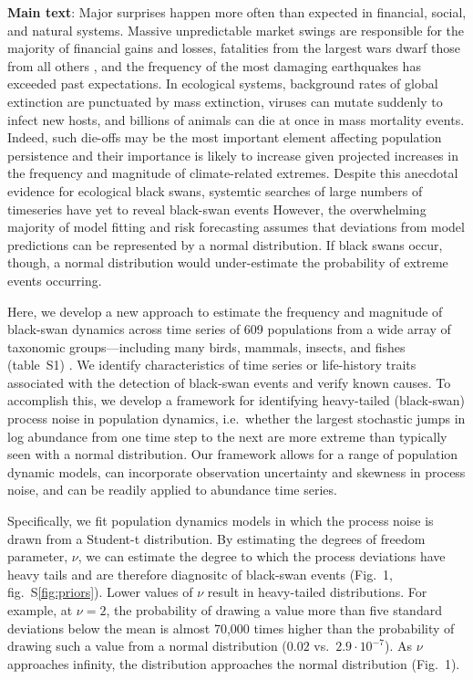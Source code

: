 \textbf{Main text}:
Major surprises happen more often than expected in financial, social, and natural systems\cite{taleb2007, sornette2009, may2008}. Massive unpredictable market swings are responsible for the majority of financial gains and losses\cite{taleb2007}, fatalities from the largest wars dwarf those from all others \cite{newman2005}, and the frequency of the most damaging earthquakes has exceeded past expectations\cite{sornette2009}. In ecological systems, background rates of global extinction are punctuated by mass extinction\cite{harnik2012}, viruses can mutate suddenly to infect new hosts, and billions of animals can die at once in mass mortality events\cite{fey2015}. Indeed, such die-offs may be the most important element affecting population persistence\cite{mangel1994} and their importance is likely to increase given projected increases in the frequency and magnitude of climate-related extremes\cite{ipcc2012}. Despite this anecdotal evidence for ecological black swans, systemtic searches of large numbers of timeseries have yet to reveal black-swan events\cite{keitt1998, allen2001, halley2002} However, the overwhelming majority of model fitting and risk forecasting assumes that deviations from model predictions can be represented by a normal distribution\cite[e.g.][]{brook2006a, knape2012}. If black swans occur, though, a normal distribution would under-estimate the probability of extreme events occurring.

Here, we develop a new approach to estimate the frequency and magnitude of black-swan dynamics across time series of 609 populations from a wide array of taxonomic groups---including many  birds, mammals, insects, and fishes (table~S1) \cite{SOM}. We identify characteristics of time series or life-history traits associated with the detection of black-swan events and verify known causes. To accomplish this, we develop a framework for identifying heavy-tailed (black-swan) process noise in population dynamics, i.e.~whether the largest stochastic jumps in log abundance from one time step to the next are more extreme than typically seen with a normal distribution. Our framework allows for a range of population dynamic models, can incorporate observation uncertainty and skewness in process noise, and can be readily applied to abundance time series.

Specifically, we fit population dynamics models in which the process noise is drawn from a Student-t distribution. By estimating the degrees of freedom parameter, \(\nu\), we can estimate the degree to which the process deviations have heavy tails and are therefore diagnositc of black-swan events (Fig.~1, fig.~S\ref{fig:priors}). Lower values of \(\nu\) result in heavy-tailed distributions. For example, at \(\nu = 2\), the probability of drawing a value more than five standard deviations below the mean is almost 70,000 times higher than the probability of drawing such a value from a normal distribution (\(0.02\) vs.\ \(2.9\cdot10^{-7}\)). As \(\nu\) approaches infinity, the distribution approaches the normal distribution (Fig.~1).

